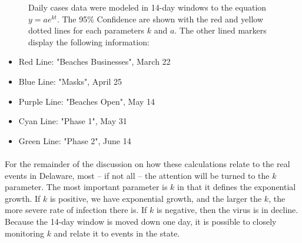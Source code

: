 \documentclass[12pt]{article}
\begin{document}
\begin{figure}[h]
  \centering
  \hfill
  \hfill
  \caption{Daily cases data were modeled in 14-day windows to the equation $y=ae^{kt}$. The 95\% Confidence are shown with the red and yellow dotted lines for each parameters $k$ and $a$. The other lined markers display the following information:}
  \label{fig:3}
\end{figure}

\begin{itemize}
  \item Red Line: "Beaches Businesses", March 22
  \item Blue Line: "Masks", April 25
  \item Purple Line: "Beaches Open", May 14
  \item Cyan Line: "Phase 1", May 31
  \item Green Line: "Phase 2", June 14
\end{itemize}

\paragraph{}For the remainder of the discussion on how these calculations relate to the real events in Delaware, most -- if not all -- the attention will be turned to the $k$ parameter. The most important parameter is $k$ in that it defines the exponential growth. If $k$ is positive, we have exponential growth, and the larger the $k$, the more severe rate of infection there is. If $k$ is negative, then the virus is in decline. Because the 14-day window is moved down one day, it is possible to closely monitoring $k$ and relate it to events in the state.
\end{document}
